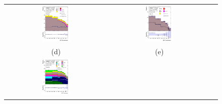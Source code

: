 \documentclass[PAPER, coverpage, atlasdraft=true, texlive=2016, UKenglish]{\ATLASLATEXPATH atlasdoc} %
\providecommand{\DIFadd}[1]{{\protect\color{blue}\uwave{#1}}} %
\providecommand{\DIFaddFL}[1]{\DIFadd{#1}} %
\providecommand{\DIFaddbeginFL}{} %
\providecommand{\DIFaddendFL}{} %
\providecommand{\DIFdelbeginFL}{} %
\providecommand{\DIFdelendFL}{} %
\begin{document}
\begin{figure}[H]
\begin{tabular}{@{}ccc@{}}
\DIFdelbeginFL %
\DIFdelendFL \DIFaddbeginFL \includegraphics[width=0.29\textwidth]{figures/tcH_reg1l1tau1b3j_os.pdf}\DIFaddendFL &
\DIFaddbeginFL \includegraphics[width=0.29\textwidth]{figures/tcH_reg1l2tau1bnj_ss.pdf}\DIFaddendFL \\
(d) & (e)  \DIFaddbeginFL & \DIFaddFL{(f) }\DIFaddendFL \\
\DIFdelbeginFL %
\DIFdelendFL %
\DIFaddbeginFL \includegraphics[width=0.29\textwidth]{figures/tcH_reg2mtau1b2jos.pdf}\DIFaddendFL &
\DIFdelbeginFL %

\end{tabular}
\end{figure}
\end{document}
